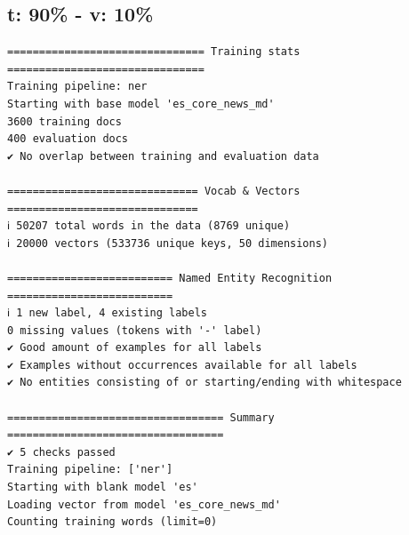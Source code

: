 \documentclass[12pt,a4paper,]{scrartcl}
\begin{document}
\hypertarget{t-90---v-10}{%
\subsection{t: 90\% - v: 10\%}\label{t-90---v-10}}

\begin{verbatim}
=============================== Training stats ===============================
Training pipeline: ner
Starting with base model 'es_core_news_md'
3600 training docs
400 evaluation docs
✔ No overlap between training and evaluation data

============================== Vocab & Vectors ==============================
ℹ 50207 total words in the data (8769 unique)
ℹ 20000 vectors (533736 unique keys, 50 dimensions)

========================== Named Entity Recognition ==========================
ℹ 1 new label, 4 existing labels
0 missing values (tokens with '-' label)
✔ Good amount of examples for all labels
✔ Examples without occurrences available for all labels
✔ No entities consisting of or starting/ending with whitespace

================================== Summary ==================================
✔ 5 checks passed
Training pipeline: ['ner']
Starting with blank model 'es'
Loading vector from model 'es_core_news_md'
Counting training words (limit=0)
\end{verbatim}
\end{document}
